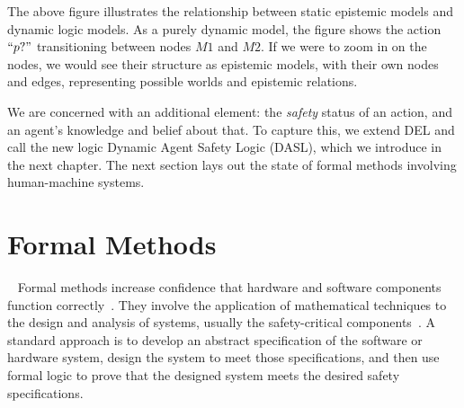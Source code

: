 \begin {center}
\end{center}

The above figure illustrates the relationship between static epistemic models and dynamic logic models. As a purely dynamic model, the figure shows the action $``p?"$ transitioning between nodes $M1$ and $M2$. If we were to zoom in on the nodes, we would see their structure as epistemic models, with their own nodes and edges, representing possible worlds and epistemic relations.

We are concerned with an additional element: the \emph{safety} status of an action, and an agent's knowledge and belief about that. To capture this, we extend DEL and call the new logic Dynamic Agent Safety Logic (DASL), which we introduce in the next chapter. The next section lays out the state of formal methods involving human-machine systems.

\section{Formal Methods}~\label{fm}
Formal methods increase confidence that hardware and software components function correctly~\cite{RushbyFMbook}. They involve the application of mathematical techniques to the design and analysis of systems, usually the safety-critical components~\cite{johnson_butler_fm}. A standard approach is to develop an abstract specification of the software or hardware system, design the system to meet those specifications, and then use formal logic to prove that the designed system meets the desired safety specifications. 

